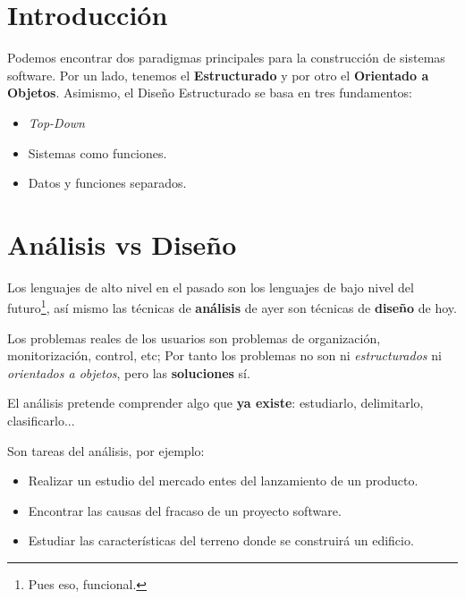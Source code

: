 

\section{Introducción}

Podemos encontrar dos paradigmas principales para la construcción de sistemas
software. Por un lado, tenemos el \textbf{Estructurado} y por otro el
\textbf{Orientado a Objetos}. Asimismo, el Diseño Estructurado se basa en tres
fundamentos:

\begin{itemize}[noitemsep]
\item \emph{Top-Down}
\item Sistemas como funciones.
\item Datos y funciones separados.
\end{itemize}


\section{Análisis vs Diseño}

Los lenguajes de alto nivel en el pasado son los lenguajes de bajo nivel del futuro\footnote{Pues eso, funcional.}, así mismo las técnicas de \textbf{análisis} de ayer son técnicas de \textbf{diseño} de hoy.

Los problemas reales de los usuarios son problemas de organización, monitorización, control, etc; Por tanto los problemas no son ni \textit{estructurados} ni \textit{orientados a objetos}, pero las \textbf{soluciones} sí.

El análisis pretende comprender algo que \textbf{ya existe}: estudiarlo, delimitarlo, clasificarlo...

Son tareas del análisis, por ejemplo:

\begin{itemize}[noitemsep]
\item Realizar un estudio del mercado entes del lanzamiento de un producto.
\item Encontrar las causas del fracaso de un proyecto software.
\item Estudiar las características del terreno donde se construirá un edificio.
\end{itemize}

